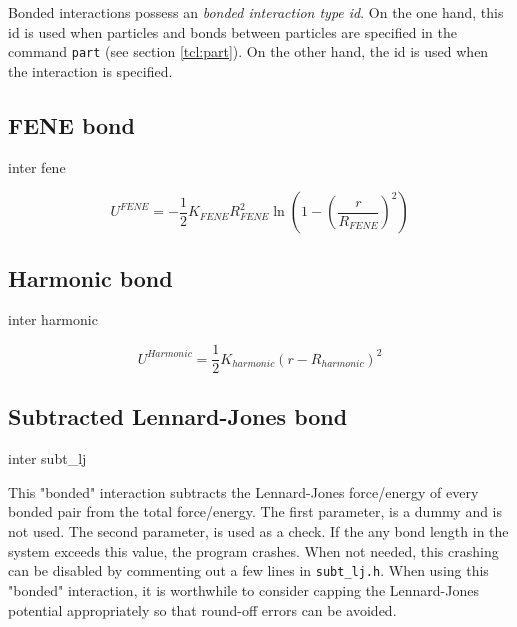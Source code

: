  Bonded interactions possess an
\emph{bonded interaction type id}. On the one hand, this id is used
when particles and bonds between particles are specified in the
command \texttt{part} (see section \vref{tcl:part}).  On the other
hand, the id is used when the interaction is specified.

\subsection{FENE bond}

\begin{essyntax}
  inter 
  fene
   
\end{essyntax}

\[ U^{FENE} = -\frac{1}{2} K_{FENE} R_{FENE}^2 \ln \left( 1 - \left( \frac{r}{R_{FENE}} \right)^2 \right) \]

\subsection{Harmonic bond}

\begin{essyntax}
  inter 
  harmonic
\end{essyntax}

\[ U^{Harmonic} = \frac{1}{2} K_{harmonic} \left( r - R_{harmonic} \right)^2 \]

\subsection{Subtracted Lennard-Jones bond}

\begin{essyntax}
  inter 
  subt_lj
   
\end{essyntax}

This "bonded" interaction subtracts the Lennard-Jones force/energy of
every bonded pair from the total force/energy. The first parameter,
 is a dummy and is not used. The second parameter,
 is used as a check. If the any bond length in the
system exceeds this value, the program crashes. When not needed, this
crashing can be disabled by commenting out a few lines in
\texttt{subt_lj.h}.  When using this "bonded" interaction, it is
worthwhile to consider capping the Lennard-Jones potential
appropriately so that round-off errors can be avoided.

